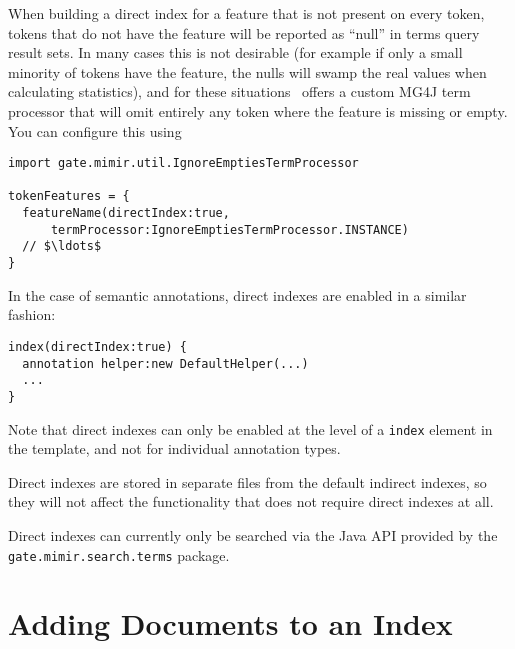 When building a direct index for a feature that is not present on every token,
tokens that do not have the feature will be reported as ``null'' in terms query
result sets.  In many cases this is not desirable (for example if only a small
minority of tokens have the feature, the nulls will swamp the real values when
calculating statistics), and for these situations \Mimir\ offers a custom MG4J
term processor that will omit entirely any token where the feature is missing
or empty.  You can configure this using
\begin{lstlisting}[texcl]
import gate.mimir.util.IgnoreEmptiesTermProcessor

tokenFeatures = {
  featureName(directIndex:true,
      termProcessor:IgnoreEmptiesTermProcessor.INSTANCE)
  // $\ldots$
}
\end{lstlisting}

In the case of semantic annotations, direct indexes are enabled in a similar
fashion:
\begin{lstlisting}
index(directIndex:true) {
  annotation helper:new DefaultHelper(...)
  ...
}
\end{lstlisting}

Note that direct indexes can only be enabled at the level of a {\tt index}
element in the template, and not for individual annotation types.

Direct indexes are stored in separate files from the default indirect indexes,
so they will not affect the functionality that does not require direct indexes
at all.

Direct indexes can currently only be searched via the Java API provided by the
{\tt gate.mimir.search.terms} package.

\section{Adding Documents to an Index}\label{sec:indexing:add-docs}


